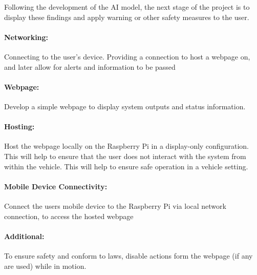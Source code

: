 Following the development of the AI model, the next stage of the project is to display these findings and apply warning or other
safety measures to the user.
\paragraph{Networking:}
    Connecting to the user’s device. Providing a connection to host a webpage on, and later allow for alerts and information to be
    passed
\paragraph{Webpage:}
	Develop a simple webpage to display system outputs and status information.
\paragraph{Hosting:}
    Host the webpage locally on the Raspberry Pi in a display-only configuration. This will help to ensure that the user does not
    interact with the system from within the vehicle. This will help to ensure safe operation in a vehicle setting.
\paragraph{Mobile Device Connectivity:}
    Connect the users mobile device to the Raspberry Pi via local network connection, to access the hosted webpage
\paragraph{Additional:}
    To ensure safety and conform to laws, disable actions form the webpage (if any are used) while in motion.